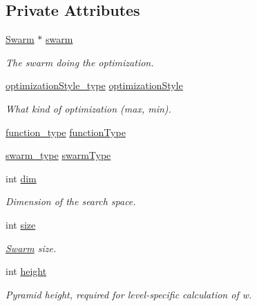 \subsection*{Private Attributes}
\begin{CompactItemize}
\item 
\hyperlink{classSwarm}{Swarm} $\ast$ \hyperlink{classPSO_cd056ef7ca1e694cd770c2b800a1c31c}{swarm}
\begin{CompactList}\small\item\em The swarm doing the optimization. \item\end{CompactList}\item 
\hyperlink{optfunctions_8h_ffa6bae3252bfc599bbc9e7b8862352a}{optimizationStyle\_\-type} \hyperlink{classPSO_27295f34a6ad7f97533907344edebb97}{optimizationStyle}
\begin{CompactList}\small\item\em What kind of optimization (max, min). \item\end{CompactList}\item 
\hyperlink{optfunctions_8h_6e6333c061b2073ba9abaaf67e20164b}{function\_\-type} \hyperlink{classPSO_7ff7e28f5428af6383f97d41a14ab91c}{functionType}
\item 
\hyperlink{pso_8h_42bcedc2c7cf9459c9669f9df4f61ebd}{swarm\_\-type} \hyperlink{classPSO_ab45164d2c0f86041d014fa51ebb78b5}{swarmType}
\item 
int \hyperlink{classPSO_4f1ce768b59640f64ed2b270764b32b1}{dim}
\begin{CompactList}\small\item\em Dimension of the search space. \item\end{CompactList}\item 
int \hyperlink{classPSO_4b11170c3bceecfa6baa5e09b53ead3e}{size}
\begin{CompactList}\small\item\em \hyperlink{classSwarm}{Swarm} size. \item\end{CompactList}\item 
int \hyperlink{classPSO_11d390b01da4feb9669afd003cf13288}{height}
\begin{CompactList}\small\item\em Pyramid height, required for level-specific calculation of w. \item\end{CompactList}\item 

\end{CompactItemize}
